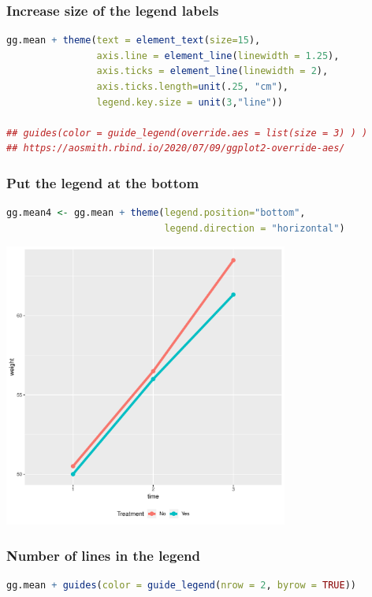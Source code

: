 \documentclass{article}
\begin{document}
\clearpage
\subsubsection{Increase size of the legend labels}
\label{sec:orge7e40b3}
\begin{lstlisting}[language=r,numbers=none]
gg.mean + theme(text = element_text(size=15), 
                axis.line = element_line(linewidth = 1.25),
                axis.ticks = element_line(linewidth = 2),
                axis.ticks.length=unit(.25, "cm"),
                legend.key.size = unit(3,"line"))

## guides(color = guide_legend(override.aes = list(size = 3) ) )
## https://aosmith.rbind.io/2020/07/09/ggplot2-override-aes/
\end{lstlisting}
\subsubsection{Put the legend at the bottom}
\label{sec:org0b1daf2}
\begin{lstlisting}[language=r,numbers=none]
gg.mean4 <- gg.mean + theme(legend.position="bottom",
                            legend.direction = "horizontal")
\end{lstlisting}

\begin{center}
\includegraphics[trim={0 0 0 0},width=0.7\textwidth]{./figures/fig-meanTime4.pdf}
\end{center}
\clearpage
\subsubsection{Number of lines in the legend}
\label{sec:org9ce3506}
\begin{lstlisting}[language=r,numbers=none]
gg.mean + guides(color = guide_legend(nrow = 2, byrow = TRUE))
\end{lstlisting}
\end{document}
